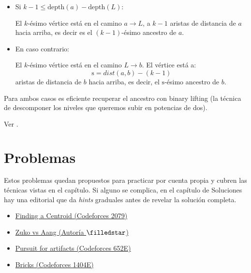 \begin{itemize}
    \item Si $k-1 \leq \text{depth}(a)- \text{depth}(L)$:
    
          El $k$-ésimo vértice está en el camino $a \to L$, a $k-1$ aristas de
          distancia de $a$ hacia arriba, es decir es el $(k-1)$-ésimo ancestro de $a$.
 
    \item En caso contrario:
    
          El $k$-ésimo vértice está en el camino
          $L \to b$. El vértice está a:
          \[\text{s} = dist(a,b)-(k-1)\]
          aristas de distancia de $b$ hacia arriba, es decir, el $\text{s}$-ésimo ancestro de $b$.
\end{itemize}
 Para ambos casos es eficiente recuperar el ancestro con binary lifting (la técnica de descomponer los niveles que queremos subir en potencias de dos).

 Ver .

\section{Problemas}

Estos problemas quedan propuestos para practicar por cuenta propia y cubren las técnicas vistas en el capítulo. Si alguno se complica, en el capítulo de Soluciones hay una editorial que da \textit{hints} graduales antes de revelar la solución completa.

\begin{itemize}
  \item[9.11.1] \href{https://cses.fi/problemset/task/2079}{Finding a Centroid (Codeforces 2079)}
  \item[9.11.2] \href{https://codeforces.com/group/DH4HPwQlLU/contest/689800/problem/I}{Zuko vs Aang (Autoría $\filledstar$)}
  \item[9.11.3] \href{https://codeforces.com/problemset/problem/652/E}{Pursuit for artifacts (Codeforces 652E)}
  \item[9.11.4] \href{https://codeforces.com/contest/1404/problem/E}{Bricks (Codeforces 1404E)}
\end{itemize}